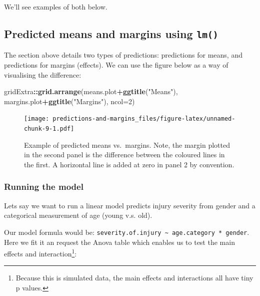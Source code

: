 \documentclass[]{article}
\newenvironment{Shaded}{\begin{snugshade}}{\end{snugshade}}
\newcommand{\KeywordTok}[1]{\textcolor[rgb]{0.13,0.29,0.53}{\textbf{#1}}}
\newcommand{\DataTypeTok}[1]{\textcolor[rgb]{0.13,0.29,0.53}{#1}}
\newcommand{\DecValTok}[1]{\textcolor[rgb]{0.00,0.00,0.81}{#1}}
\newcommand{\StringTok}[1]{\textcolor[rgb]{0.31,0.60,0.02}{#1}}
\newcommand{\OperatorTok}[1]{\textcolor[rgb]{0.81,0.36,0.00}{\textbf{#1}}}
\newcommand{\NormalTok}[1]{#1}
\let\rmarkdownfootnote\footnote%
\def\footnote{\protect\rmarkdownfootnote}
\theoremstyle{definition}
\theoremstyle{definition}
\theoremstyle{definition}
\theoremstyle{remark}
\begin{document}
We'll see examples of both below.

\subsection*{\texorpdfstring{Predicted means and margins using
\texttt{lm()}}{Predicted means and margins using lm()}}\label{predicted-means-and-margins-using-lm}

The section above details two types of predictions: predictions for
means, and predictions for margins (effects). We can use the figure
below as a way of visualising the difference:

\begin{Shaded}
\begin{Highlighting}[]
\NormalTok{gridExtra}\OperatorTok{::}\KeywordTok{grid.arrange}\NormalTok{(means.plot}\OperatorTok{+}\KeywordTok{ggtitle}\NormalTok{(}\StringTok{"Means"}\NormalTok{), margins.plot}\OperatorTok{+}\KeywordTok{ggtitle}\NormalTok{(}\StringTok{"Margins"}\NormalTok{), }\DataTypeTok{ncol=}\DecValTok{2}\NormalTok{)}
\end{Highlighting}
\end{Shaded}

\begin{figure}
\centering
\texttt{[image: predictions-and-margins\_files/figure-latex/unnamed-chunk-9-1.pdf]}
\caption{\label{fig:unnamed-chunk-9}Example of predicted means vs.~margins.
Note, the margin plotted in the second panel is the difference between
the coloured lines in the first. A horizontal line is added at zero in
panel 2 by convention.}
\end{figure}

\subsubsection*{Running the model}\label{running-the-model}

Lets say we want to run a linear model predicts injury severity from
gender and a categorical measurement of age (young v.s. old).

Our model formula would be:
\texttt{severity.of.injury\ \textasciitilde{}\ age.category\ *\ gender}.
Here we fit it an request the Anova table which enables us to test the
main effects and interaction\footnote{Because this is simulated data,
  the main effects and interactions all have tiny p values.}:
\end{document}
